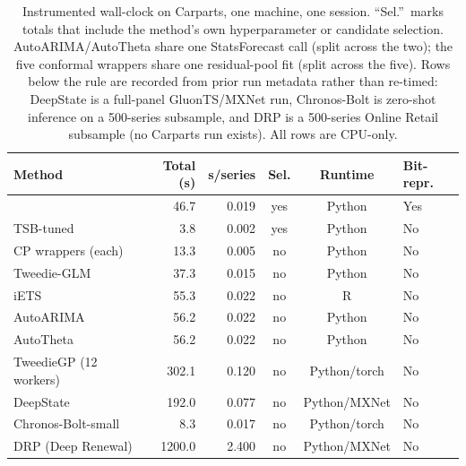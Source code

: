\begin{table}[t]
\centering
\caption{Instrumented wall-clock on Carparts, one machine, one session.
``Sel.''\ marks totals that include the method's own hyperparameter or
candidate selection. AutoARIMA/AutoTheta share one StatsForecast call
(split across the two); the five conformal wrappers share one
residual-pool fit (split across the five). Rows below the rule are
recorded from prior run metadata rather than re-timed: DeepState is a
full-panel GluonTS/MXNet run, Chronos-Bolt is zero-shot inference on a
500-series subsample, and DRP is a 500-series Online Retail subsample
(no Carparts run exists). All rows are CPU-only.}
\label{tab:efficiency}
\small
\setlength{\tabcolsep}{4.5pt}
\begin{tabular}{lrrccl}
\toprule
Method & Total (s) & s/series & Sel. & Runtime & Bit-repr.\\
\midrule
\EBB{} & 46.7 & 0.019 & yes & Python & Yes\\
TSB-tuned & 3.8 & 0.002 & yes & Python & No\\
CP wrappers (each) & 13.3 & 0.005 & no & Python & No\\
Tweedie-GLM & 37.3 & 0.015 & no & Python & No\\
iETS & 55.3 & 0.022 & no & R & No\\
AutoARIMA & 56.2 & 0.022 & no & Python & No\\
AutoTheta & 56.2 & 0.022 & no & Python & No\\
TweedieGP (12 workers) & 302.1 & 0.120 & no & Python/torch & No\\
\midrule
DeepState & 192.0 & 0.077 & no & Python/MXNet & No\\
Chronos-Bolt-small & 8.3 & 0.017 & no & Python/torch & No\\
DRP (Deep Renewal) & 1200.0 & 2.400 & no & Python/MXNet & No\\
\bottomrule
\end{tabular}
\end{table}

